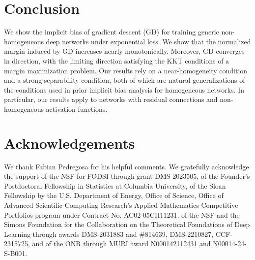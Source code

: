 \section{Conclusion} \label{sec:conclusion}
We show the implicit bias of gradient descent (GD) for training generic non-homogeneous deep networks under exponential loss.
We show that the normalized margin induced by GD increases nearly monotonically.
Moreover, GD converges in direction, with the limiting direction satisfying the KKT conditions of a margin maximization problem.
Our results rely on a near-homogeneity condition and a strong separability condition, both of which are natural generalizations of the conditions used in prior implicit bias analysis for homogeneous networks. 
In particular, our results apply to networks with residual connections and non-homogeneous activation functions.



\section*{Acknowledgements}
We thank Fabian Pedregosa for his helpful comments.
We gratefully acknowledge the support of the NSF for FODSI through grant DMS-2023505, of the Founder's Postdoctoral Fellowship in Statistics at Columbia University, of the Sloan Fellowship by the U.S. Department of Energy, Office of Science, Office of Advanced Scientific Computing Research’s Applied Mathematics Competitive Portfolios program under Contract No. AC02-05CH11231, of the NSF and the Simons Foundation for the Collaboration on the Theoretical Foundations of Deep Learning through awards DMS-2031883 and \#814639, DMS-2210827, CCF-2315725, and of the ONR through MURI award N000142112431 and N00014-24-S-B001.